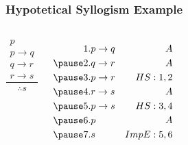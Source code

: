 \documentclass[dvipsnames]{beamer}
\begin{document}
\begin{frame}
  \frametitle{Hypotetical Syllogism Example}

  \begin{columns}
    \[
    \frac
      {
        \begin{array}{c}
          p\\
          p \rightarrow q\\
          q \rightarrow r\\
          r \rightarrow s
        \end{array}
      }
      {
        \therefore s
      }
    \]

    \pause
    \begin{eqnarray*}
      1. & p \rightarrow q & A\\
      \pause
      2. & q \rightarrow r & A\\
      \pause
      3. & p \rightarrow r & HS:1,2\\
      \pause
      4. & r \rightarrow s & A\\
      \pause
      5. & p \rightarrow s & HS:3,4\\
      \pause
      6. & p               & A\\
      \pause
      7. & s               & ImpE:5,6
    \end{eqnarray*}
  \end{columns}
\end{frame}

%
%
\end{document}
